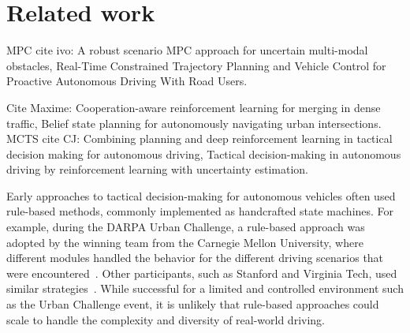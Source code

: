 \chapter{Related work}\label{chapter:related_work}

MPC cite ivo:
A robust scenario MPC approach for uncertain multi-modal obstacles,
Real-Time Constrained Trajectory Planning and Vehicle Control for Proactive Autonomous Driving With Road Users.

Cite Maxime: 
Cooperation-aware reinforcement learning for merging in dense traffic, 
Belief state planning for autonomously navigating urban intersections.
MCTS cite CJ:
Combining planning and deep reinforcement learning in tactical decision making for autonomous driving,
Tactical decision-making in autonomous driving by reinforcement learning with uncertainty estimation.


Early approaches to tactical decision-making for autonomous vehicles often used rule-based methods, commonly implemented as handcrafted state machines. For example, during the DARPA Urban Challenge, a rule-based approach was adopted by the winning team from the Carnegie Mellon University, where different modules handled the behavior for the different driving scenarios that were encountered~\cite{darpaCMU}. Other participants, such as Stanford and Virginia Tech, used similar strategies~\cite{Bacha2008, darpaStanford}. While successful for a limited and controlled environment such as the Urban Challenge event, it is unlikely that rule-based approaches could scale to handle the complexity and diversity of real-world driving.

